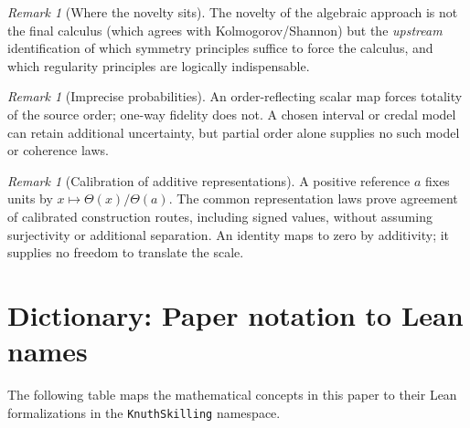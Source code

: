 \documentclass[11pt]{article}
\theoremstyle{definition}
\theoremstyle{remark}
\newtheorem{remark}[theorem]{Remark}
\begin{document}
\begin{remark}[Where the novelty sits]
The novelty of the algebraic approach is not the final calculus (which agrees with
Kolmogorov/Shannon) but the \emph{upstream} identification of which symmetry principles
suffice to force the calculus, and which regularity principles are logically indispensable.
\end{remark}

\begin{remark}[Imprecise probabilities]
An order-reflecting scalar map forces totality of the source order; one-way
fidelity does not. A chosen interval or credal model can retain additional
uncertainty, but partial order alone supplies no such model or coherence laws.
\end{remark}

\begin{remark}[Calibration of additive representations]
A positive reference $a$ fixes units by $x\mapsto\Theta(x)/\Theta(a)$.
The common representation laws prove agreement of calibrated construction routes,
including signed values, without assuming surjectivity or additional separation.
An identity maps to zero by additivity; it supplies no freedom to translate the scale.
\end{remark}

\appendix

\section{Dictionary: Paper notation to Lean names}

The following table maps the mathematical concepts in this paper to their Lean formalizations
in the \texttt{KnuthSkilling} namespace.
\end{document}
